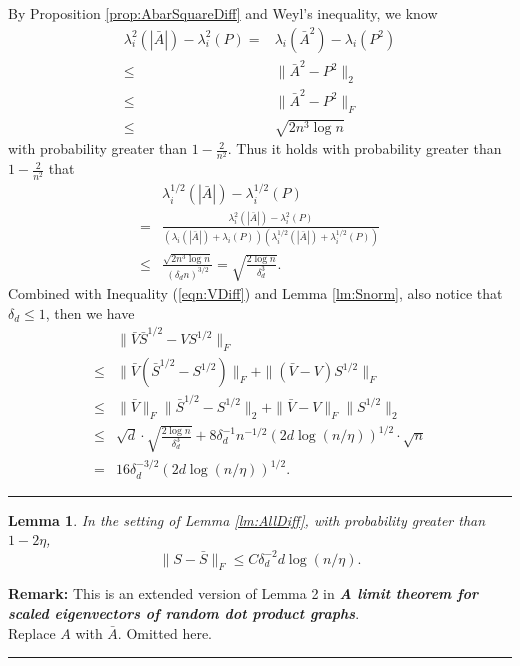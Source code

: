 \documentclass[a4paper]{article}
\newenvironment{proof}{{\bf Proof:  }}{\hfill\rule{2mm}{2mm}}
\newtheorem{lemma}[fact]{Lemma}
\begin{document}
\begin{proof}
By Proposition \ref{prop:AbarSquareDiff} and Weyl's inequality, we know
\begin{align*}
	\lambda_i^2(|\bar{A}|) - \lambda_i^2(P) = & \lambda_i(\bar{A}^2) - \lambda_i(P^2) \\
    \le & \| \bar{A}^2 - P^2 \|_2 \\
    \le & \| \bar{A}^2 - P^2 \|_F \\
    \le & \sqrt{2 n^3 \log n}
\end{align*}
with probability greater than $1 - \frac{2}{n^2}$.
Thus it holds with probability greater than $1 - \frac{2}{n^2}$ that
\begin{align*}
	& \lambda_i^{1/2}(|\bar{A}|) - \lambda_i^{1/2}(P) \\
    = & \frac{\lambda_i^2(|\bar{A}|) - \lambda_i^2(P)}{\left(\lambda_i(|\bar{A}|) + \lambda_i(P)\right)\left(\lambda_i^{1/2}(|\bar{A}|) + \lambda_i^{1/2}(P)\right)} \\
    \le & \frac{\sqrt{2 n^3 \log n}}{(\delta_d n)^{3/2}}
    = \sqrt{\frac{2 \log n}{\delta_d^3}}.
\end{align*}
Combined with Inequality (\ref{eqn:VDiff}) and Lemma \ref{lm:Snorm}, also notice that $\delta_d \le 1$, then we have
\begin{align*}
	& \|\bar{V} \bar{S}^{1/2} - V S^{1/2} \|_F \\
    \le & \| \bar{V} ( \bar{S}^{1/2} - S^{1/2} ) \|_F + \| ( \bar{V} - V) S^{1/2} \|_F \\
    \le & \|\bar{V}\|_F \|\bar{S}^{1/2} - S^{1/2}\|_2 + \| \bar{V} - V\|_F \|S^{1/2}\|_2 \\
    \le & \sqrt{d} \cdot \sqrt{\frac{2 \log n}{\delta_d^3}} + 8 \delta_d^{-1} n^{-1/2} (2d \log(n/\eta))^{1/2} \cdot \sqrt{n} \\
    = & 16 \delta_d^{-3/2} (2d \log(n/\eta))^{1/2}.
\end{align*}
\end{proof}









\begin{lemma}
\label{lm:SDiff}
In the setting of Lemma \ref{lm:AllDiff}, with probability greater than $1-2\eta$,
\[
	\|S - \bar{S}\|_F \le C \delta_d^{-2} d \log(n/\eta).
\]
\end{lemma}
\textbf{Remark:} This is an extended version of Lemma 2 in \textbf{\textit{A limit theorem for scaled eigenvectors of random dot product graphs}}. \\
\noindent
\begin{proof}
Replace $A$ with $\bar{A}$. Omitted here.
\end{proof}
\end{document}
